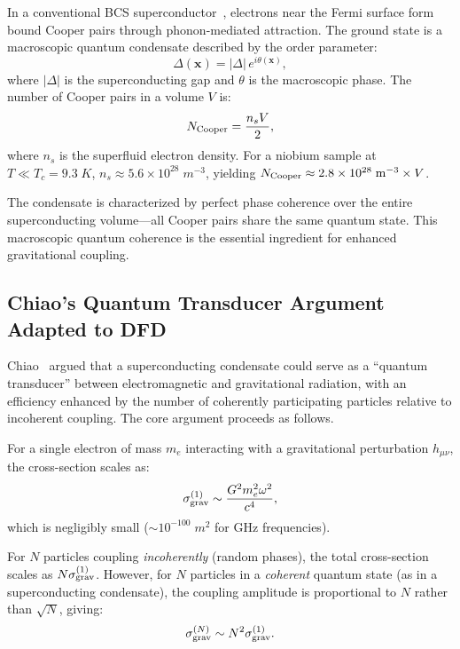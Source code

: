\documentclass[twocolumn,prl,superscriptaddress,nofootinbib,longbibliography,floatfix]{revtex4-2}
\begin{document}
In a conventional BCS superconductor~\cite{BCS1957}, electrons near the
Fermi surface form bound Cooper pairs through phonon-mediated
attraction.  The ground state is a macroscopic quantum condensate
described by the order parameter:
\begin{equation}
\Delta(\mathbf{x}) = |\Delta|\,e^{i\theta(\mathbf{x})},
\label{eq:gap}
\end{equation}
where $|\Delta|$ is the superconducting gap and $\theta$ is the
macroscopic phase.  The number of Cooper pairs in a volume $V$ is:
\begin{equation}
N_{\rm Cooper} = \frac{n_s V}{2},
\label{eq:Ncooper}
\end{equation}
where $n_s$ is the superfluid electron density.  For a niobium sample
at $T \ll T_c = 9.3\;\si{K}$, $n_s \approx 5.6 \times
10^{28}\;\si{m^{-3}}$, yielding $N_{\rm Cooper} \approx 2.8 \times
10^{28}\;\si{m^{-3}} \times V$.

The condensate is characterized by perfect phase coherence over the
entire superconducting volume---all Cooper pairs share the same quantum
state.  This macroscopic quantum coherence is the essential ingredient
for enhanced gravitational coupling.

\subsection{Chiao's Quantum Transducer Argument Adapted to DFD}

Chiao~\cite{Chiao2002,Chiao2004,Chiao2009} argued that a
superconducting condensate could serve as a ``quantum transducer''
between electromagnetic and gravitational radiation, with an efficiency
enhanced by the number of coherently participating particles relative
to incoherent coupling.  The core argument proceeds as follows.

For a single electron of mass $m_e$ interacting with a gravitational
perturbation $h_{\mu\nu}$, the cross-section scales as:
\begin{equation}
\sigma_{\rm grav}^{(1)} \sim \frac{G^2 m_e^2 \omega^2}{c^4},
\label{eq:sigma-single}
\end{equation}
which is negligibly small ($\sim 10^{-100}\;\si{m^2}$ for GHz
frequencies).

For $N$ particles coupling \emph{incoherently} (random phases), the
total cross-section scales as $N\sigma_{\rm grav}^{(1)}$.  However, for
$N$ particles in a \emph{coherent} quantum state (as in a
superconducting condensate), the coupling amplitude is proportional to
$N$ rather than $\sqrt{N}$, giving:
\begin{equation}
\sigma_{\rm grav}^{(N)} \sim N^2 \sigma_{\rm grav}^{(1)}.
\label{eq:sigma-coherent}
\end{equation}
\end{document}
